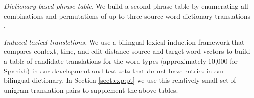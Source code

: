 \documentclass[11pt]{article}
\newcommand{\paraheader}[1]{\vskip 0.05in \noindent\emph{#1}}
\begin{document}
\paraheader{Dictionary-based phrase table.} We build a second phrase table by enumerating all combinations and permutations of up to three source word dictionary translations \cite{garera08a}. %

\paraheader{Induced lexical translations.} We use a bilingual lexical induction framework that compares context, time, and edit distance source and target word vectors to build a table of candidate translations for the word types (approximately 10,000 for Spanish) in our development and test sets that do not have entries in our bilingual dictionary. In Section \ref{sect:exp:pt} we use this relatively small set of unigram translation pairs to supplement the above tables.

\end{document}
